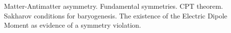 \documentclass{article}
\begin{document}
Matter-Antimatter asymmetry.
Fundamental symmetries. CPT theorem.
Sakharov conditions for baryogenesis.
The existence of the Electric Dipole Moment as evidence of a symmetry violation.
\end{document}
